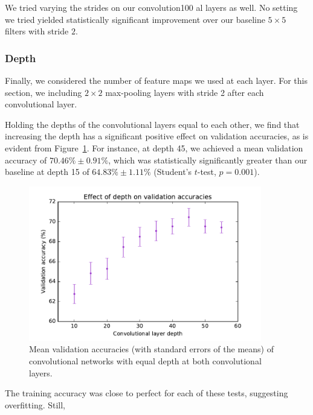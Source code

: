 \documentclass{article}
\begin{document}
\begin{multicols}{2}
We tried varying the strides on our convolution100
al layers as well.
No setting we tried yielded statistically significant improvement
over our baseline $5\times 5$ filters with stride $2$.


\subsubsection{Depth}

Finally, we considered the number of feature maps
we used at each layer.
For this section,
we including $2\times 2$ max-pooling layers with stride 2
after each convolutional layer.

Holding the depths of the convolutional layers
equal to each other,
we find that increasing the depth has a significant positive effect
on validation accuracies,
as is evident from Figure~\ref{fig:2-5-conv-depth-val-acc}.
For instance, at depth 45,
we achieved a mean validation accuracy of $70.46\% \pm 0.91\%$,
which was statistically significantly greater
than our baseline at depth 15 of $64.83\% \pm 1.11\%$
(Student's $t$-test, $p=0.001$).

\begin{figure}[t]
   \centering
   \includegraphics[width=4in]{img/2-5-conv-depth-val-acc.pdf}
   \caption{Mean validation accuracies (with standard errors of the means)
       of convolutional networks with equal depth at both convolutional layers.}
   \label{fig:2-5-conv-depth-val-acc}
\end{figure}

The training accuracy was close to perfect
for each of these tests,
suggesting overfitting.
Still, 








\end{multicols}
\end{document}
